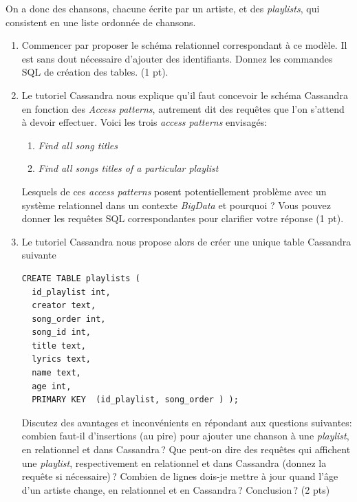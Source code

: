 \documentclass[11pt,a4paper]{article}
\begin{document}
On a donc des chansons, chacune écrite par un artiste, et des \textit{playlists}, qui consistent
en une liste ordonnée de chansons.

\begin{enumerate}
  \item Commencer par proposer le schéma relationnel correspondant à ce modèle. Il est sans
      dout nécessaire d'ajouter des identifiants. Donnez les commandes SQL de création des tables. (1 pt).
   
   \item Le tutoriel Cassandra nous explique qu'il faut concevoir le schéma Cassandra en fonction
   des \textit{Access patterns}, autrement dit des requêtes que l'on s'attend à devoir effectuer. Voici
   les trois \textit{access patterns} envisagés:
   \begin{enumerate}
      \item \textit{Find all song titles}
      \item \textit{Find all songs titles of a particular playlist}
   \end{enumerate}
   
   Lesquels  de ces \textit{access patterns} posent potentiellement problème avec un système relationnel
   dans un contexte \textit{BigData} et pourquoi ? Vous pouvez donner les requêtes SQL correspondantes
   pour clarifier votre réponse (1 pt).
   
   \item Le tutoriel Cassandra nous propose alors de créer une unique table Cassandra suivante
   
\begin{verbatim}
CREATE TABLE playlists (
  id_playlist int,
  creator text,
  song_order int,
  song_id int,
  title text,
  lyrics text,
  name text,
  age int,
  PRIMARY KEY  (id_playlist, song_order ) );
\end{verbatim} 

   Discutez des avantages et inconvénients en répondant aux questions suivantes: combien faut-il d'insertions
   (au pire) pour ajouter une chanson à une \textit{playlist}, en relationnel et dans Cassandra\,? Que peut-on dire
   des requêtes qui affichent une  \textit{playlist}, respectivement en relationnel et dans Cassandra (donnez
   la requête si nécessaire)\,? Combien de  lignes  dois-je mettre à jour quand l'âge d'un artiste change,
   en relationnel et en Cassandra\,? Conclusion\,? (2 pts)
 

\end{enumerate}
\end{document}
